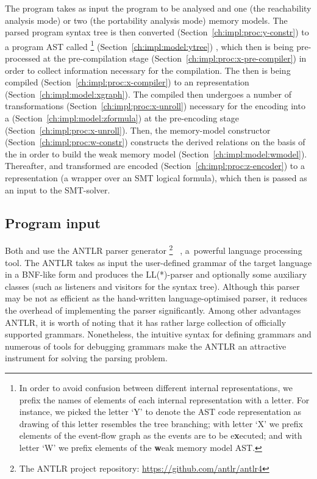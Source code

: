 The program takes as input the program to be analysed and one (the reachability analysis mode) or two (the portability analysis mode) memory models. The parsed program syntax tree is then converted (Section~\ref{ch:impl:proc:y-constr}) to a program AST called \ytree{}%
\footnote{In order to avoid confusion between different internal representations, we prefix the names of elements of each internal representation with a letter. For instance, we picked the letter `Y' to denote the AST code representation as drawing of this letter resembles the tree branching; with letter `X' we prefix elements of the event-flow graph as the events are to be e\textbf{x}ecuted; and with letter `W' we prefix elements of the \textbf{w}eak memory model AST.} %
(Section~\ref{ch:impl:model:ytree})
, which then is being pre-processed at the pre-compilation stage (Section~\ref{ch:impl:proc:x-pre-compiler}) in order to collect information necessary for the compilation.
The \ytree{} then is being compiled (Section~\ref{ch:impl:proc:x-compiler}) to an \xgraph{} representation (Section~\ref{ch:impl:model:xgraph}).
The compiled \xgraph{} then undergoes a number of transformations (Section~\ref{ch:impl:proc:x-unroll}) necessary for the encoding into a \zformula{} (Section~\ref{ch:impl:model:zformula}) at the pre-encoding stage (Section~\ref{ch:impl:proc:x-unroll}).
Then, the memory-model constructor (Section~\ref{ch:impl:proc:w-constr}) constructs the derived relations on the basis of the \xgraph{} in order to build the weak memory model \wmodel{} (Section~\ref{ch:impl:model:wmodel}).
Thereafter, \wmodel{} and transformed \xgraph{} are encoded (Section~\ref{ch:impl:proc:z-encoder}) to a \zformula{} representation (a wrapper over an SMT logical formula), which then is passed as an input to the SMT-solver.

\subsection{Program input}
\label{ch:impl:input}

Both \porthos[1] and \porthos[2] use the ANTLR parser generator%
\footnote{The ANTLR project repository: \url{https://github.com/antlr/antlr4}}%
~\cite{parr2013definitive}, a~powerful language processing tool.
The ANTLR takes as input the user-defined grammar of the target language in a BNF-like form and produces the LL(*)-parser and optionally some auxiliary classes (such as listeners and visitors for the syntax tree).
Although this parser may be not as efficient as the hand-written language-optimised parser, it reduces the overhead of implementing the parser significantly.
Among other advantages ANTLR, it is worth of noting that it has rather large collection of officially supported grammars. Nonetheless, the intuitive syntax for defining grammars and numerous of tools for debugging grammars make the ANTLR an attractive instrument for solving the parsing problem.

